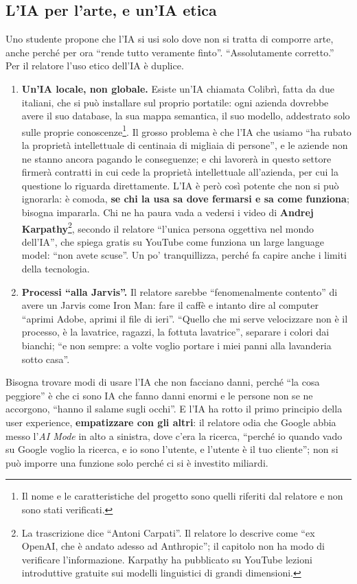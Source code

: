 \subsection{L'IA per l'arte, e un'IA etica}

Uno studente propone che l'IA si usi solo dove non si tratta di comporre arte,
anche perché per ora ``rende tutto veramente finto''. ``Assolutamente
corretto.'' Per il relatore l'uso etico dell'IA è duplice.
\begin{enumerate}
  \item \textbf{Un'IA locale, non globale.} Esiste un'IA chiamata Colibrì,
        fatta da due italiani, che si può installare sul proprio portatile:
        ogni azienda dovrebbe avere il suo database, la sua mappa semantica,
        il suo modello, addestrato solo sulle proprie conoscenze\footnote{Il
        nome e le caratteristiche del progetto sono quelli riferiti dal
        relatore e non sono stati verificati.}. Il grosso problema è che l'IA
        che usiamo ``ha rubato la proprietà intellettuale di centinaia di
        migliaia di persone'', e le aziende non ne stanno ancora pagando le
        conseguenze; e chi lavorerà in questo settore firmerà contratti in cui
        cede la proprietà intellettuale all'azienda, per cui la questione lo
        riguarda direttamente. L'IA è però così potente che non si può
        ignorarla: è comoda, \textbf{se chi la usa sa dove fermarsi e sa come
        funziona}; bisogna impararla. Chi ne ha paura vada a vedersi i video di
        \textbf{Andrej Karpathy}\footnote{La trascrizione dice ``Antoni
        Carpati''. Il relatore lo descrive come ``ex OpenAI, che è andato adesso
        ad Anthropic''; il capitolo non ha modo di verificare l'informazione.
        Karpathy ha pubblicato su YouTube lezioni introduttive gratuite sui
        modelli linguistici di grandi dimensioni.}, secondo il relatore
        ``l'unica persona oggettiva nel mondo dell'IA'', che spiega gratis su
        YouTube come funziona un large language model: ``non avete scuse''. Un
        po' tranquillizza, perché fa capire anche i limiti della tecnologia.
  \item \textbf{Processi ``alla Jarvis''.} Il relatore sarebbe
        ``fenomenalmente contento'' di avere un Jarvis come Iron Man: fare il
        caffè e intanto dire al computer ``aprimi Adobe, aprimi il file di
        ieri''. ``Quello che mi serve velocizzare non è il processo, è la
        lavatrice, ragazzi, la fottuta lavatrice'', separare i colori dai
        bianchi; ``e non sempre: a volte voglio portare i miei panni alla
        lavanderia sotto casa''.
\end{enumerate}
Bisogna trovare modi di usare l'IA che non facciano danni, perché ``la cosa
peggiore'' è che ci sono IA che fanno danni enormi e le persone non se ne
accorgono, ``hanno il salame sugli occhi''. E l'IA ha rotto il primo principio
della user experience, \textbf{empatizzare con gli altri}: il relatore odia
che Google abbia messo l'\emph{AI Mode} in alto a sinistra, dove c'era la
ricerca, ``perché io quando vado su Google voglio la ricerca, e io sono
l'utente, e l'utente è il tuo cliente''; non si può imporre una funzione solo
perché ci si è investito miliardi.

